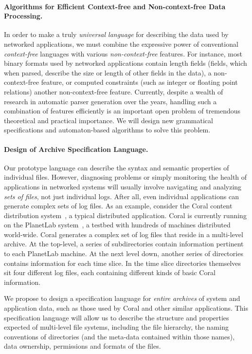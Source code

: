 \paragraph*{Algorithms for Efficient Context-free and Non-context-free Data Processing.}
In order to make \pads{} a truly {\em universal language} for describing the data used by
networked applications, we must combine the expressive power of conventional 
{\em context-free} languages with various {\em non-context-free} features.  
For instance, most binary formats used by networked applications
contain length fields (fields, which when parsed,
describe the size or length of other fields in the data), a non-context-free feature,
or computed constraints (such as integer or floating point relations) another non-context-free
feature.  Currently, despite a wealth of research in automatic parser generation over the years,
handling such a combination of features efficiently is an important open problem of tremendous
theoretical and practical importance.  We will design new grammatical specifications
and automaton-based algorithms to solve this problem.

\paragraph*{Design of Archive Specification Language.}  
Our prototype \pads{} language can describe the syntax and semantic properties
of individual files.  However, diagnosing problems or simply monitoring
the health of applications in networked systems
will usually involve navigating and analyzing {\em sets of files},
not just individual logs.  After all, even individual
applications can generate complex sets of log files. 
As an example, consider the Coral content
distribution system~\cite{coral}, a typical distributed application.
Coral is currently running on the PlanetLab system~\cite{planetlab}, a
testbed with hundreds of machines distributed world-wide.
Coral generates a complex set of log files that
reside in a multi-level archive.  At the top-level, a series of subdirectories
contain information pertinent to each PlanetLab machine.  At the next level down,
another series of directories contains information for each time slice.  In the
time slice directories themselves sit four different log files, each containing different 
kinds of basic Coral information.

We propose to design a specification language for {\em entire archives} of 
system and application data, such as those used by Coral and other similar
applications.  This specification language will allow us to describe the structure and
properties expected of multi-level file systems, including the file hierarchy, the
naming conventions of directories (and the meta-data contained within those names), data 
ownership, permissions and formats of the files.

